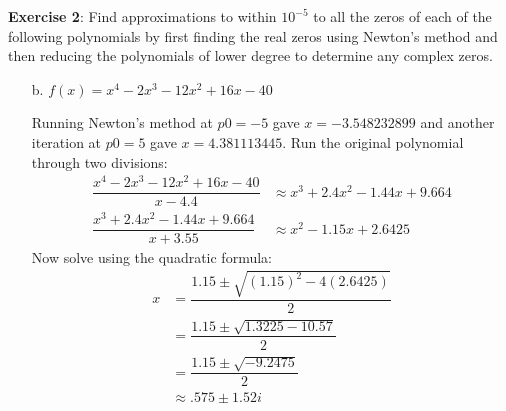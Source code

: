 \documentclass{article}
\begin{document}
\textbf{Exercise 2}: Find approximations to within $10^{-5}$ to all the zeros of each of the following polynomials by first finding the real zeros using Newton's method and then reducing the polynomials of lower degree to determine any complex zeros.
    \begin{itemize}
        \item [b.] $f(x) = x^{4} - 2x^{3} - 12x^{2} + 16x - 40$
            \begin{answer}
                Running Newton's method at $p0 = -5$ gave $x = -3.548232899$ and another iteration at $p0 = 5$ gave $x = 4.381113445$. Run the original polynomial through two divisions:
                    \begin{align*}
                        \dfrac{x^{4} - 2x^{3} - 12x^{2} + 16x - 40}{x - 4.4} &\approx x^{3} + 2.4x^{2} -1.44x + 9.664 \\
                        \dfrac{x^{3} + 2.4x^{2} - 1.44x + 9.664}{x + 3.55}   &\approx x^{2} - 1.15x + 2.6425            
                    \end{align*}
                Now solve using the quadratic formula:
                    \begin{align*}
                        x &=       \dfrac{1.15 \pm \sqrt{(1.15)^{2} - 4(2.6425)}}{2} \\
                          &=       \dfrac{1.15 \pm \sqrt{1.3225 - 10.57}}{2}         \\
                          &=       \dfrac{1.15 \pm \sqrt{-9.2475}}{2}                \\
                          &\approx .575 \pm 1.52i                                      
                    \end{align*}
            \end{answer}


\end{itemize}
\end{document}
